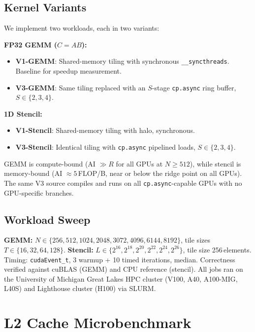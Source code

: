\documentclass[sigplan,nonacm,10pt]{acmart}
\newcommand{\cpasync}{\texttt{cp.async}}
\begin{document}
\subsection{Kernel Variants}

We implement two workloads, each in two variants:

\textbf{FP32 GEMM ($C = AB$):}
\begin{itemize}
\item \textbf{V1-GEMM}: Shared-memory tiling with synchronous
  \texttt{\_\_syncthreads}. Baseline for speedup measurement.
\item \textbf{V3-GEMM}: Same tiling replaced with an $S$-stage
  \cpasync{} ring buffer, $S \in \{2, 3, 4\}$.
\end{itemize}

\textbf{1D Stencil:}
\begin{itemize}
\item \textbf{V1-Stencil}: Shared-memory tiling with halo, synchronous.
\item \textbf{V3-Stencil}: Identical tiling with \cpasync{} pipelined
  loads, $S \in \{2, 3, 4\}$.
\end{itemize}

GEMM is compute-bound (AI $\gg R$ for all GPUs at $N \geq 512$), while
stencil is memory-bound (AI $\approx 5$\,FLOP/B, near or below the
ridge point on all GPUs).
The same V3 source compiles and runs on all \cpasync{}-capable GPUs
with no GPU-specific branches.

\subsection{Workload Sweep}

\textbf{GEMM:} $N \in \{256, 512, 1024, 2048, 3072, 4096, 6144, 8192\}$,
tile sizes $T \in \{16, 32, 64, 128\}$.
\textbf{Stencil:} $L \in \{2^{16}, 2^{18}, 2^{20}, 2^{22}, 2^{24}, 2^{26}\}$,
tile size 256\,elements.
Timing: \texttt{cudaEvent\_t}, 3 warmup + 10 timed iterations, median.
Correctness verified against cuBLAS (GEMM) and CPU reference (stencil).
All jobs ran on the University of Michigan Great Lakes HPC cluster
(V100, A40, A100-MIG, L40S) and Lighthouse cluster (H100) via SLURM.

\section{L2 Cache Microbenchmark}
\label{sec:microbench}
\end{document}
